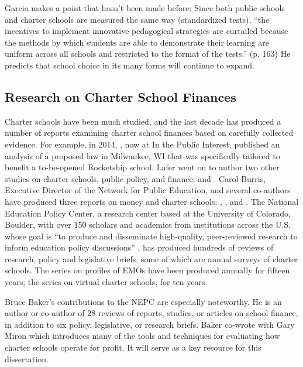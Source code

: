 Garcia makes a point that hasn't been made before: Since both public schools and charter schools are measured the same way (standardized tests), ``the incentives to implement innovative pedagogical strategies are curtailed because the methods by which students are able to demonstrate their learning are uniform across all schools and restricted to the format of the tests.'' (p. 163) He predicts that school choice in its many forms will continue to expand.

\subsection{Research on Charter School Finances}\label{sec:rese-chart-scho}\indent

Charter schools have been much studied, and the last decade has produced a number of reports examining charter school finances based on carefully collected evidence. For example, in 2014, \textcite{Lafer2014}, now at In the  Public Interest, published an analysis of a proposed law in Milwaukee, WI \parencite{Lafer2014} that was specifically tailored to benefit a to-be-opened Rocketship school. Lafer went on to author two other studies on charter schools, public policy, and finance:  \parencite{Lafer2017} and  \parencite{Lafer2018}. Carol Burris, Executive Director of the Network for Public Education, and several co-authors have produced three reports on money and charter schools: \textcite{Burris.Pfleger2020}, \textcite{Burris.Bryant2020}, and \textcite{Burris.Cimarusti2021}. The National Education Policy Center, a research center based at the University of Colorado, Boulder, with over 150 scholars and academics from institutions across the U.S. whose goal is ``to produce and disseminate high-quality, peer-reviewed research to inform education policy discussions'' \parencite{NEPC2021}, has produced hundreds of reviews of research, policy and legislative briefs, some of which are annual surveys of charter schools. The series on profiles of EMOs have been produced annually for fifteen years; the series on virtual charter schools, for ten years.

Bruce Baker's contributions to the NEPC are especially noteworthy. He is an author or co-author of 28 reviews of reports, studies, or articles on school finance, in addition to six policy, legislative, or research briefs. Baker co-wrote with Gary Miron  \parencite{Baker.Miron2015} which introduces many of the tools and techniques for evaluating how charter schools operate for profit. It will serve as a key resource for this dissertation.

